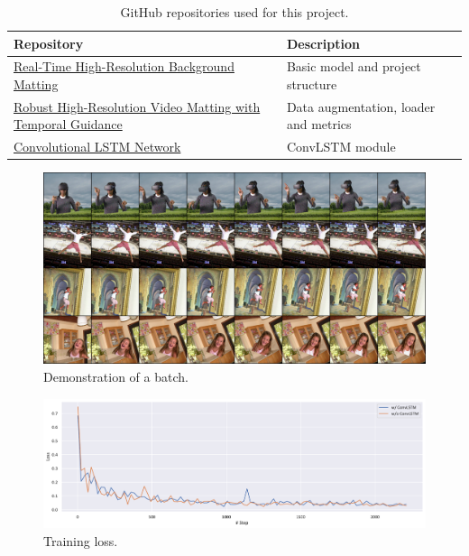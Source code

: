 \documentclass[final]{cvpr}
\begin{document}
\begin{table}[htb]
    \centering
    \caption{GitHub repositories used for this project.}
    \label{repository}
    \begin{tabular}{ll}
        \toprule
        Repository                                                                                                                                                & Description                           \\
        \midrule
        \href{https://github.com/PeterL1n/BackgroundMattingV2}{Real-Time High-Resolution Background Matting}\cite{linRealTimeHighResolutionBackground2020a}       & Basic model and project structure     \\
        \href{https://github.com/PeterL1n/RobustVideoMatting}{Robust High-Resolution Video Matting with Temporal Guidance}\cite{linRobustHighResolutionVideo2021} & Data augmentation, loader and metrics \\
        \href{https://github.com/ndrplz/ConvLSTM_pytorch}{Convolutional LSTM Network}\cite{shiConvolutionalLSTMNetwork2015}                                       & ConvLSTM module                       \\
        \bottomrule
    \end{tabular}
\end{table}

\begin{figure}[htb]
    \begin{center}
        \includegraphics[width=1\textwidth]{img/batch.png}
    \end{center}
    \caption{Demonstration of a batch.}
    \label{batch}
\end{figure}

\begin{figure}[htb]
    \begin{center}
        \includegraphics[width=1\textwidth]{img/runs.pdf}
    \end{center}
    \caption{Training loss.}
    \label{runs}
\end{figure}
\end{document}
